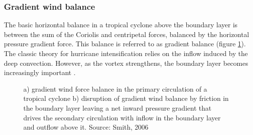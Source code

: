 \subsubsection{Gradient wind balance}%

The basic horizontal balance in a tropical cyclone above the boundary layer is between the sum of the Coriolis and centripetal forces, balanced by the horizontal pressure gradient force. This balance is referred to as gradient balance (figure \ref{fig:cyclone_circ}). %
The classic theory for hurricane intensification relies on the inflow induced by the deep convection. However, as the vortex strengthens, the boundary layer becomes increasingly important \citep{under_hurr}.




\begin{figure}[h]
	\centering
	
	\caption{a) gradient wind force balance in the primary circulation of a tropical cyclone b) disruption of gradient wind balance by friction in the boundary layer leaving a net inward pressure gradient that drives the secondary circulation with inflow in the boundary layer and outflow above it. Source: Smith, 2006}\label{fig:cyclone_circ}
\end{figure}

